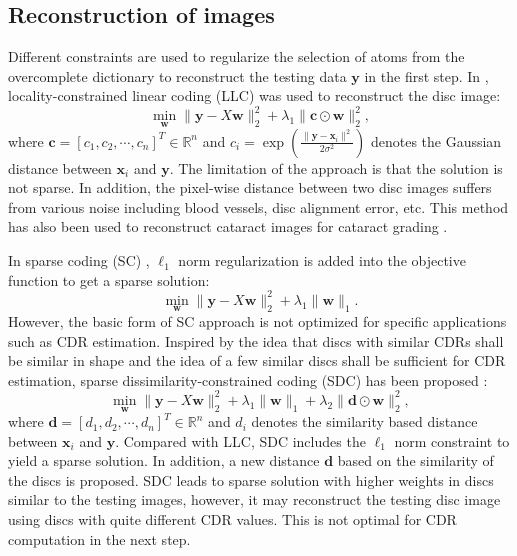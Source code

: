 \documentclass[journal]{IEEEtran}
\begin{document}
    \subsection{Reconstruction of images}
        Different constraints are used to regularize the selection of atoms from the overcomplete dictionary to reconstruct the testing data $\textbf{y}$ in the first step.
    In \cite{YW13},   locality-constrained linear coding (LLC) \cite{llc2010} was used to reconstruct the disc image:
        \begin{equation}
    \min_{\textbf{w}} \|{\textbf{y}}-{X}\textbf{w}\|^2_2+\lambda_1  \|\textbf{c}\odot \textbf{w}\|_2^2, \label{llcobj}
    \end{equation}
    where $\textbf{c}=[c_1, c_2, \cdots, c_n]^T\in \mathbb{R}^n$ and $c_i= \exp(\frac{\|\textbf{y}-\textbf{x}_i\|^2}{2\sigma^2})$ denotes the Gaussian distance  between $\textbf{x}_i$ and $\textbf{y}$.
    The limitation of the approach is that the solution is not sparse. In addition, the pixel-wise distance between two disc
    images suffers from various noise including blood vessels, disc alignment error, etc.
  This method has also been used to reconstruct cataract images for cataract grading \cite{yanwu2016}.

 In sparse coding (SC) \cite{sparsecoding}, $\ell_1$ norm regularization is added into the objective function to get a sparse solution:
       \begin{equation}
   \min_{\textbf{w}} \|{\textbf{y}}-{X}\textbf{w}\|^2_2+\lambda_1 \|\textbf{w}\|_1.  \label{scobj}
   \end{equation}
      However, the basic form of SC approach is not optimized for specific applications such as CDR estimation.
      Inspired by the idea that discs with similar CDRs shall be similar in shape and the idea of a few similar discs shall be sufficient for CDR estimation,  sparse dissimilarity-constrained coding (SDC) has been proposed \cite{CJ15}:
      \begin{equation} \min_{\textbf{w}}\|{\textbf{y}}-{X}\textbf{w}\|^2_2+ \lambda_1 \|\textbf{w}\|_1+ \lambda_2\| \textbf{d}\odot \textbf{w}\|_2^2,
    \end{equation}
      where $\textbf{d}=[d_1, d_2, \cdots, d_n]^T\in \mathbb{R}^n$ and $d_i$ denotes the similarity based distance  between $\textbf{x}_i$ and $\textbf{y}$.
    Compared with LLC, SDC includes the $\ell_1$ norm constraint to yield a sparse solution. In addition, a new distance $\textbf{d}$ based on  the similarity  of the discs is proposed.
   SDC leads to sparse solution with higher weights in discs similar to the testing images, however, it may reconstruct the testing disc image using discs with quite different CDR values. This is not optimal for CDR computation in the next step.
\end{document}
